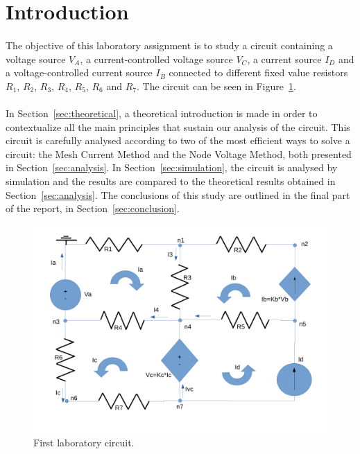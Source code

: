 \section{Introduction}
\label{sec:introduction}

\paragraph{} 
The objective of this laboratory assignment is to study a circuit containing a voltage source $V_A$, a current-controlled voltage source $V_C$, a current source $I_D$ and a voltage-controlled current source $I_B$ connected to different fixed value resistors $R_1$, $R_2$, $R_3$, $R_4$, $R_5$, $R_6$ and $R_7$. The circuit can be seen in Figure~\ref{fig:circuit}.

\paragraph{}
In Section~\ref{sec:theoretical}, a theoretical introduction is made in order to contextualize all the main principles that sustain our analysis of the circuit. This circuit is carefully analysed according to two of the most efficient ways to solve a circuit: the Mesh Current Method and the Node Voltage Method, both presented in Section~\ref{sec:analysis}. In Section~\ref{sec:simulation}, the circuit is analysed by simulation and the results are compared to the theoretical results obtained in Section~\ref{sec:analysis}. The conclusions of this study are outlined in the final part of the report, in Section~\ref{sec:conclusion}.

\begin{figure}[h] \centering
\includegraphics[width=0.7\linewidth]{circuit.pdf}
\caption{First laboratory circuit.}
\label{fig:circuit}
\end{figure}

